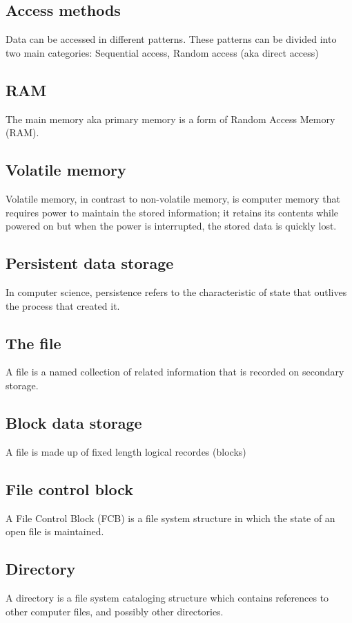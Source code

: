 \subsection{Access methods}
Data can be accessed in different patterns. These
patterns can be divided into two main categories:
Sequential access,
Random access (aka direct access)

\subsection{RAM}
The main memory aka primary memory
is a form of Random Access Memory (RAM).

\subsection{Volatile memory}
Volatile memory, in contrast to non-volatile memory, is computer
memory that requires power to maintain the stored
information; it retains its contents while powered on but when
the power is interrupted, the stored data is quickly lost.

\subsection{Persistent data storage}
In computer science, persistence refers to the
characteristic of state that outlives the process
that created it.

\subsection{The file}
A file is a named collection of related
information that is recorded on
secondary storage.

\subsection{Block data storage}
A file is made up of fixed length logical recordes (blocks)

\subsection{File control block}
A File Control Block (FCB) is a file
system structure in which the state of an
open file is maintained.

\subsection{Directory}
 A directory is a file system cataloging
structure which contains references to
other computer files, and possibly other directories.


